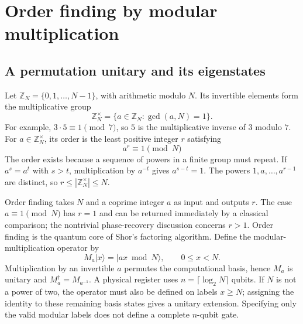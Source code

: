 \documentclass[11pt,oneside,openany]{book}
\providecommand{\ket}{}
\renewcommand{\ket}[1]{\lvert #1\rangle}
\theoremstyle{definition}
\begin{document}
\section{Order finding by modular multiplication}

\subsection{A permutation unitary and its eigenstates}

Let $\mathbb Z_N=\{0,1,\ldots,N-1\}$, with arithmetic modulo $N$. Its invertible elements form the multiplicative group
\begin{equation}
 \mathbb Z_N^{\times}=\{a\in\mathbb Z_N:\gcd(a,N)=1\}.
\end{equation}
For example, $3\cdot5\equiv1\pmod7$, so $5$ is the multiplicative inverse of $3$ modulo $7$. For $a\in\mathbb Z_N^{\times}$, its order is the least positive integer $r$ satisfying
\begin{equation}
 a^r\equiv1\pmod N
 \label{eq:phase:order}
\end{equation}
The order exists because a sequence of powers in a finite group must repeat. If $a^s=a^t$ with $s>t$, multiplication by $a^{-t}$ gives $a^{s-t}=1$. The powers $1,a,\ldots,a^{r-1}$ are distinct, so $r\le|\mathbb Z_N^{\times}|\le N$.

Order finding takes $N$ and a coprime integer $a$ as input and outputs $r$. The case $a\equiv1\pmod N$ has $r=1$ and can be returned immediately by a classical comparison; the nontrivial phase-recovery discussion concerns $r>1$. Order finding is the quantum core of Shor's factoring algorithm\cite{Shor1997}. Define the modular-multiplication operator by
\begin{equation}
 M_a\ket x=\ket{ax\bmod N},\qquad 0\le x<N.
 \label{eq:phase:modularmult}
\end{equation}
Multiplication by an invertible $a$ permutes the computational basis, hence $M_a$ is unitary and $M_a^{\dagger}=M_{a^{-1}}$. A physical register uses $n=\lceil\log_2N\rceil$ qubits. If $N$ is not a power of two, the operator must also be defined on labels $x\ge N$; assigning the identity to these remaining basis states gives a unitary extension. Specifying only the valid modular labels does not define a complete $n$-qubit gate.
\end{document}
